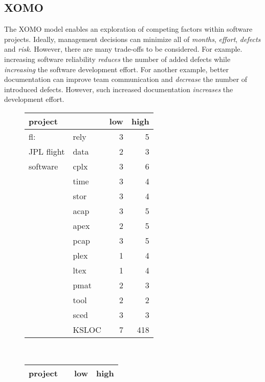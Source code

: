 \subsection{XOMO}


The XOMO model enables an exploration of competing factors 
within software projects. Ideally, management decisions can minimize
all of  {\em months}, {\em
  effort}, {\em defects} and {\em risk}. However, there are many trade-offs to be considered.
For
example.
increasing
software reliability   {\em reduces} the
  number of added defects while {\em increasing} the 
software development effort. For another example,
better documentation can improve team communication and {\em decrease} the number of introduced defects.
However, such increased documentation {\em increases} the development effort.

\begin{figure}[!t]
\scriptsize
\begin{tabular}{l@{~}|l@{~}r@{~}r@{~}}
project&&low&high\\\hline
fl:&rely&3&5\\
JPL flight &data&2&3\\
software&cplx&3&6\\
&time&3&4\\
&stor&3&4\\
&acap&3&5\\
&apex&2&5\\
&pcap&3&5\\
&plex&1&4\\
&ltex&1&4\\
&pmat&2&3\\
&tool&2&2\\
&sced&3&3\\
&KSLOC&7&418
\end{tabular}~~~~~~~~~~~~~~~~~~~~~~\begin{tabular}{l@{~}|l@{~}r@{~}r@{~}}
project&&low&high\\\hline


\end{tabular}
\end{figure}
